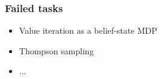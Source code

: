 \documentclass[10pt, compress]{beamer}
\begin{document}
\begin{frame}[fragile]
  \frametitle{Failed tasks}

  \begin{itemize}
  \item Value iteration as a belief-state MDP
  \item Thompson sampling
  \item ...
  \end{itemize}
\end{frame}

\end{document}
